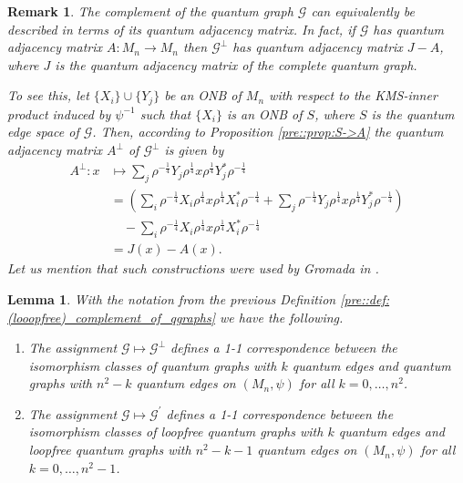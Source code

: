 \documentclass{amsart}
\newtheorem{lemma}[thm]{Lemma}
\newtheorem{remark}[thm]{Remark}
\begin{document}
\begin{remark}
    The complement of the quantum graph $\mathcal{G}$ can equivalently be described in terms of its quantum adjacency matrix. In fact, if $\mathcal{G}$ has quantum adjacency matrix $A: M_n \to M_n$ then $\mathcal{G}^\perp$ has quantum adjacency matrix $J - A$, where $J$ is the quantum adjacency matrix of the complete quantum graph. 
    
    To see this, let $\{X_i\} \cup \{Y_j\}$ be an ONB of $M_n$ with respect to the KMS-inner product induced by $\psi^{-1}$ such that $\{X_i\}$ is an ONB of $S$, where $S$ is the quantum edge space of $\mathcal{G}$. Then, according to Proposition \ref{pre::prop:S->A} the quantum adjacency matrix $A^\perp$ of $\mathcal{G}^\perp$ is given by
    \begin{align*}
        A^\perp: x 
            &\mapsto \sum_j\rho^{-\frac{1}{4}}Y_j\rho^{\frac{1}{4}}x\rho^{\frac{1}{4}}Y_j^*\rho^{-\frac{1}{4}} \\
            &= \left(\sum_i\rho^{-\frac{1}{4}}X_i\rho^{\frac{1}{4}}x\rho^{\frac{1}{4}}X_i^*\rho^{-\frac{1}{4}} + \sum_j\rho^{-\frac{1}{4}}Y_j\rho^{\frac{1}{4}}x\rho^{\frac{1}{4}}Y_j^*\rho^{-\frac{1}{4}} \right) \\
            &\quad - \sum_i\rho^{-\frac{1}{4}}X_i\rho^{\frac{1}{4}}x\rho^{\frac{1}{4}}X_i^*\rho^{-\frac{1}{4}} \\
            &= J(x) - A(x).
    \end{align*}
    Let us mention that such constructions were used by Gromada in \cite[Example 1.18]{gromada_examples_2022}.
\end{remark}

\begin{lemma}
\label{pre::lemma:1-1-correspondence_between_qgraphs_with_k_and_n2-k(-1)_edges}
    With the notation from the previous Definition \ref{pre::def:(looopfree)_complement_of_qgraphs} we have the following.
    \begin{enumerate}
        \item The assignment $\mathcal{G} \mapsto \mathcal{G}^\perp$ defines a 1-1 correspondence between the isomorphism classes of quantum graphs with $k$ quantum edges and quantum graphs with $n^2-k$ quantum edges on $(M_n, \psi)$ for all $k=0, \dots, n^2$.
        \item The assignment $\mathcal{G} \mapsto \mathcal{G}^\prime$ defines a 1-1 correspondence between the isomorphism classes of loopfree quantum graphs with $k$ quantum edges and loopfree quantum graphs with $n^2-k-1$ quantum edges on $(M_n, \psi)$ for all $k = 0, \dots, n^2-1$.
    \end{enumerate}
\end{lemma}
\end{document}
